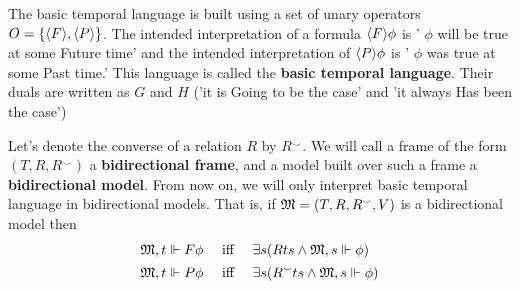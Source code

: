 \documentclass[11pt]{article}
\begin{document}
\begin{examplle}
The basic temporal language is built using a set of unary operators \(O=\{\langle
   F\rangle,\langle P\rangle\}\). The intended interpretation of a formula \(\langle F\rangle\phi\)
is ' \(\phi\) will be true at some Future time' and the intended interpretation of
\(\langle P\rangle\phi\) is ' \(\phi\) was true at some Past time.' This language is called
the \textbf{basic temporal language}. Their duals are written as \(G\) and \(H\) ('it
is Going to be the case' and 'it always Has been the case')

Let's denote the converse of a relation \(R\) by \(R^\smallsmile\). We will
call a frame of the form \((T,R,R^\smallsmile)\) a \textbf{bidirectional frame}, and a
model built over such a frame a \textbf{bidirectional model}. From now on, we will
only interpret basic temporal language in bidirectional models. That is, if
\(\mathfrak{M}=(T,R,R^\smallsmile,V)\) is a bidirectional model then
\begin{align*}
\mathfrak{M},t\Vdash F\phi \quad&\text{ iff }\quad
\exists s(Rts\wedge \mathfrak{M},s\Vdash\phi)\\
\mathfrak{M},t\Vdash P\phi \quad&\text{ iff }\quad
\exists s(R^\smallsmile ts\wedge \mathfrak{M},s\Vdash\phi)
\end{align*}
\end{examplle}
\end{document}
